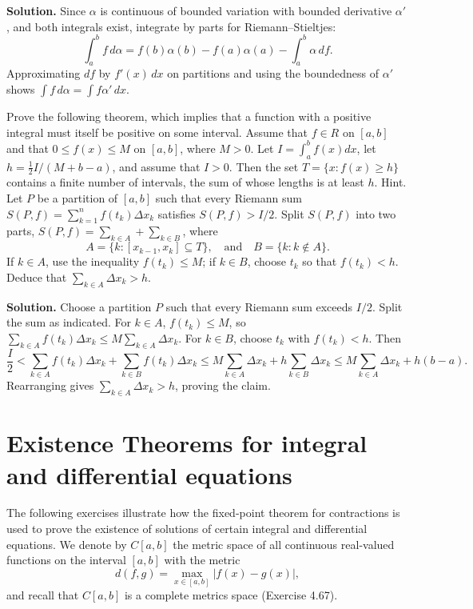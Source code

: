 \noindent\textbf{Solution.}
Since $\alpha$ is continuous of bounded variation with bounded derivative $\alpha'$, and both integrals exist, integrate by parts for Riemann–Stieltjes:
\[\int_a^b f\,d\alpha = f(b)\alpha(b)-f(a)\alpha(a)-\int_a^b \alpha\,df.
\]
Approximating $df$ by $f'(x)\,dx$ on partitions and using the boundedness of $\alpha'$ shows $\int f\,d\alpha=\int f\alpha'\,dx$.
\medskip

\begin{problembox}
Prove the following theorem, which implies that a function with a positive integral must itself be positive on some interval. Assume that $f \in R$ on $[a, b]$ and that $0 \leq f(x) \leq M$ on $[a, b]$, where $M > 0$. Let $I = \int_{a}^{b} f(x) dx$, let $h = \frac{1}{2} I/(M + b - a)$, and assume that $I > 0$. Then the set $T = \{ x : f(x) \geq h \}$ contains a finite number of intervals, the sum of whose lengths is at least $h$. Hint. Let $P$ be a partition of $[a, b]$ such that every Riemann sum $S(P, f) = \sum_{k=1}^{n} f(t_k) \Delta x_k$ satisfies $S(P, f) > I/2$. Split $S(P, f)$ into two parts, $S(P, f) = \sum_{k \in A} + \sum_{k \in B}$, where
\[A = \{ k : [x_{k-1}, x_k] \subseteq T \}, \quad \text{and} \quad B = \{ k : k \notin A \}.\]
If $k \in A$, use the inequality $f(t_k) \leq M$; if $k \in B$, choose $t_k$ so that $f(t_k) < h$. Deduce that $\sum_{k \in A} \Delta x_k > h$.
\end{problembox}

\noindent\textbf{Solution.}
Choose a partition $P$ such that every Riemann sum exceeds $I/2$. Split the sum as indicated. For $k\in A$, $f(t_k)\le M$, so $\sum_{k\in A} f(t_k)\Delta x_k\le M\sum_{k\in A}\Delta x_k$. For $k\in B$, choose $t_k$ with $f(t_k)<h$. Then
\[\frac{I}{2}<\sum_{k\in A} f(t_k)\Delta x_k+\sum_{k\in B} f(t_k)\Delta x_k\le M\sum_{k\in A}\Delta x_k + h\sum_{k\in B}\Delta x_k\le M\sum_{k\in A}\Delta x_k + h(b-a).
\]
Rearranging gives $\sum_{k\in A}\Delta x_k>h$, proving the claim.
\medskip

\section{Existence Theorems for integral and differential equations}
The following exercises illustrate how the fixed-point theorem for contractions is used to prove the existence of solutions of certain integral and differential equations. We denote by $C[a, b]$ the metric space of all continuous real-valued functions on the interval $[a, b]$ with the metric $$d(f, g) = \max_{x \in [a, b]} |f(x) - g(x)|,$$ 
and recall that $C[a,b]$ is a complete metrics space (Exercise 4.67).


